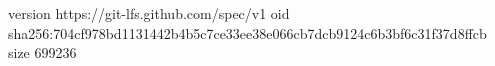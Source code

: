 version https://git-lfs.github.com/spec/v1
oid sha256:704cf978bd1131442b4b5c7ce33ee38e066cb7dcb9124c6b3bf6c31f37d8ffcb
size 699236
